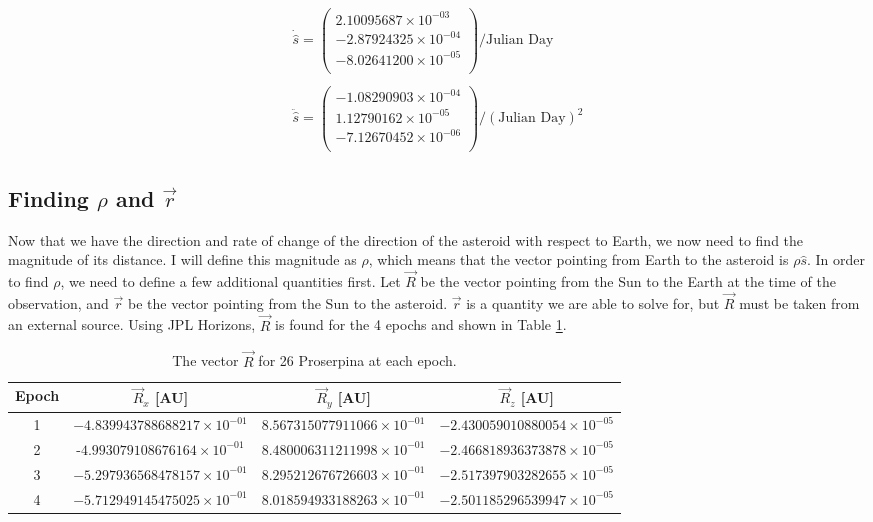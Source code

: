 \documentclass{article}
\begin{document}
\begin{equation}
\begin{aligned}
\dot{\hat{s}} =
\begin{pmatrix}
    2.10095687 \times 10^{-03}  \\
    -2.87924325 \times 10^{-04} \\
    -8.02641200 \times 10^{-05} \\
\end{pmatrix}
\slash \text{Julian Day}
\\
\\
\ddot{\hat{s}} = 
\begin{pmatrix}
    -1.08290903 \times 10^{-04} \\
    1.12790162 \times 10^{-05} \\
    -7.12670452 \times 10^{-06} \\
\end{pmatrix}
\slash (\text{Julian Day})^2
\end{aligned}
\label{eq:dots}
\end{equation}

\subsection{Finding $\rho$ and $\vec{r}$}


Now that we have the direction and rate of change of the direction of the asteroid with respect to Earth, we now need to find the magnitude of its distance. I will define this magnitude
as $\rho$, which means that the vector pointing from Earth to the asteroid is $\rho\hat{s}$. In order to find $\rho$, we need to define a few additional quantities first. Let $\vec{R}$ be the vector pointing 
from the Sun to the Earth at the time of the observation, and $\vec{r}$ be the vector pointing from the Sun to the asteroid. $\vec{r}$ is a quantity we are able to solve for, but $\vec{R}$ must be taken from 
an external source. Using JPL Horizons, $\vec{R}$ is found for the 4 epochs and shown in Table \ref{tab:R}.

\begin{table}[H]
\centering
\begin{tabular}{|c|c|c|c|}
    \hline 
    \textbf{Epoch} & \textbf{$\vec{R}_{x}$ [AU]} & \textbf{$\vec{R}_{y}$ [AU]} & \textbf{$\vec{R}_{z}$ [AU]} \\
    \hline
    1 & $-4.839943788688217 \times 10^{-01}$ & $8.567315077911066 \times 10^{-01}$ & $-2.430059010880054 \times 10^{-05}$ \\
    \hline
    2 & -$4.993079108676164 \times 10^{-01}$ & $8.480006311211998 \times 10^{-01}$ & $-2.466818936373878 \times 10^{-05}$ \\
    \hline
    3 & $-5.297936568478157 \times 10^{-01}$ & $8.295212676726603 \times 10^{-01}$ & $-2.517397903282655 \times 10^{-05}$ \\
    \hline
    4 & $-5.712949145475025 \times 10^{-01}$ & $8.018594933188263 \times 10^{-01}$ & $-2.501185296539947 \times 10^{-05}$ \\
    \hline
\end{tabular}
\caption{The vector $\vec{R}$ for 26 Proserpina at each epoch.}
\label{tab:R}
\end{table}
\end{document}

